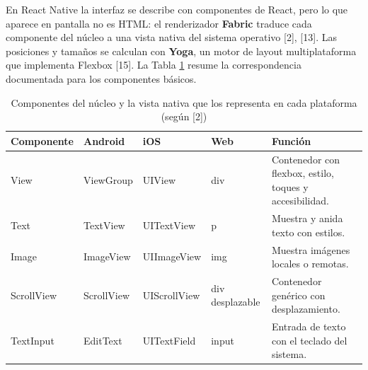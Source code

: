 \clearpage
{}

\vspace{0.2cm}

En React Native la interfaz se describe con componentes de React, pero lo que aparece en pantalla no es HTML: el renderizador \textbf{Fabric} traduce cada componente del núcleo a una vista nativa del sistema operativo [2], [13]. Las posiciones y tamaños se calculan con \textbf{Yoga}, un motor de layout multiplataforma que implementa Flexbox [15]. La Tabla \ref{tab:nativos} resume la correspondencia documentada para los componentes básicos.

\begin{table}[H]
\centering\small
\caption{Componentes del núcleo y la vista nativa que los representa en cada plataforma (según [2])}\label{tab:nativos}
\renewcommand{\arraystretch}{1.25}
\begin{tabular}{|>{\raggedright\arraybackslash}p{}|>{\raggedright\arraybackslash}p{}|>{\raggedright\arraybackslash}p{}|>{\raggedright\arraybackslash}p{}|>{\raggedright\arraybackslash}p{}|}
\hline
\rowcolor{colabpyblue} \color{white}\textbf{Componente} & \color{white}\textbf{Android} & \color{white}\textbf{iOS} & \color{white}\textbf{Web} & \color{white}\textbf{Función} \\ \hline
View & ViewGroup & UIView & div & Contenedor con flexbox, estilo, toques y accesibilidad. \\ \hline
\rowcolor{colabpybg} Text & TextView & UITextView & p & Muestra y anida texto con estilos. \\ \hline
Image & ImageView & UIImageView & img & Muestra imágenes locales o remotas. \\ \hline
\rowcolor{colabpybg} ScrollView & ScrollView & UIScrollView & div desplazable & Contenedor genérico con desplazamiento. \\ \hline
TextInput & EditText & UITextField & input & Entrada de texto con el teclado del sistema. \\ \hline
\end{tabular}
\end{table}

